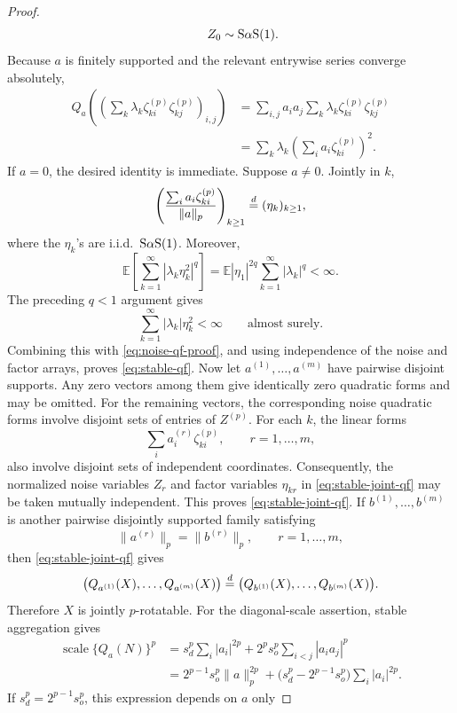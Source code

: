 \begin{proof}
\begin{equation}
\qquad
Z_0\sim\mathrm{S}\alpha\mathrm{S}(1).
\end{equation}
Because \(a\) is finitely supported and the relevant entrywise series
converge absolutely,
\begin{align*}
Q_a\!\left(
 \left(
  \sum_k
  \lambda_k\zeta^{(p)}_{ki}\zeta^{(p)}_{kj}
 \right)_{i,j}
\right)
&=
\sum_{i,j}a_ia_j
 \sum_k
 \lambda_k\zeta^{(p)}_{ki}\zeta^{(p)}_{kj}                  \\
&=
\sum_k\lambda_k
 \left(\sum_i a_i\zeta^{(p)}_{ki}\right)^2.
\end{align*}
If \(a=0\), the desired identity is immediate. Suppose \(a\neq0\).
Jointly in \(k\),
\[
\left(
 \frac{\sum_i a_i\zeta^{(p)}_{ki}}{\|a\|_p}
\right)_{k\geq1}
\overset{d}{=}
(\eta_k)_{k\geq1},
\]
where the \(\eta_k\)'s are i.i.d.\ \(\mathrm{S}\alpha\mathrm{S}(1)\). Moreover,
\[
\mathbb E\!\left[
 \sum_{k=1}^{\infty}
 |\lambda_k\eta_k^2|^q
\right]
=
\mathbb E|\eta_1|^{2q}
\sum_{k=1}^{\infty}|\lambda_k|^q
<\infty.
\]
The preceding \(q<1\) argument gives
\[
\sum_{k=1}^{\infty}|\lambda_k|\eta_k^2<\infty
\qquad\text{almost surely}.
\]
Combining this with \eqref{eq:noise-qf-proof}, and using independence
of the noise and factor arrays, proves \eqref{eq:stable-qf}.
Now let \(a^{(1)},\ldots,a^{(m)}\) have pairwise disjoint supports.
Any zero vectors among them give identically zero quadratic forms and
may be omitted. For the remaining vectors, the corresponding noise
quadratic forms involve disjoint sets of entries of \(Z^{(p)}\). For
each \(k\), the linear forms
\[
\sum_i a_i^{(r)}\zeta^{(p)}_{ki},
\qquad r=1,\ldots,m,
\]
also involve disjoint sets of independent coordinates. Consequently,
the normalized noise variables \(Z_r\) and factor variables
\(\eta_{kr}\) in \eqref{eq:stable-joint-qf} may be taken mutually
independent. This proves \eqref{eq:stable-joint-qf}.
If \(b^{(1)},\ldots,b^{(m)}\) is another pairwise disjointly supported
family satisfying
\[
\|a^{(r)}\|_p=\|b^{(r)}\|_p,
\qquad r=1,\ldots,m,
\]
then \eqref{eq:stable-joint-qf} gives
\[
\bigl(Q_{a^{(1)}}(X),\ldots,Q_{a^{(m)}}(X)\bigr)
\overset{d}{=}
\bigl(Q_{b^{(1)}}(X),\ldots,Q_{b^{(m)}}(X)\bigr).
\]
Therefore \(X\) is jointly \(p\)-rotatable.
For the diagonal-scale assertion, stable aggregation gives
\begin{align*}
\operatorname{scale}\{Q_a(N)\}^p
&=
s_d^p\sum_i|a_i|^{2p}
+
2^ps_o^p\sum_{i<j}|a_ia_j|^p                              \\
&=
2^{p-1}s_o^p\|a\|_p^{2p}
+
\bigl(s_d^p-2^{p-1}s_o^p\bigr)
\sum_i|a_i|^{2p}.
\end{align*}
If \(s_d^p=2^{p-1}s_o^p\), this expression depends on \(a\) only

\end{proof}
